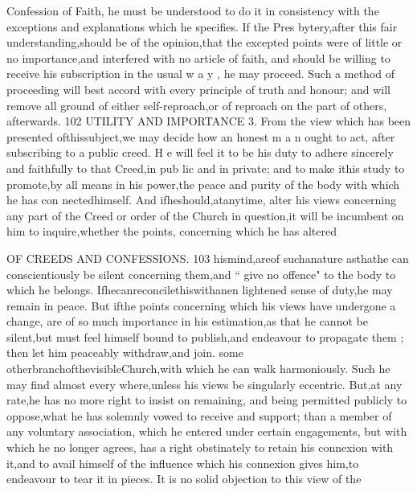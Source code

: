 \documentclass[
]{book}
\begin{document}
Confession of Faith, he must be understood to do it in consistency with the exceptions and explanations which he specifies. If the Pres bytery,after this fair understanding,should be of the opinion,that the excepted points were of little or no importance,and interfered with no article of faith, and should be willing to receive his subscription in the usual w a y , he
may proceed. Such a method of proceeding will best accord with every principle of truth and honour; and will remove all ground of either self-reproach,or of reproach on the part
of others, afterwards.
102 UTILITY AND IMPORTANCE
3. From the view which has been presented
ofthissubject,we may decide how an honest m a n ought to act, after subscribing to a public creed. H e will feel it to be his duty to adhere
sincerely and faithfully to that Creed,in pub
lic and in private; and to make ithis study to
promote,by all means in his power,the peace
and purity of the body with which he has con nectedhimself. And ifheshould,atanytime,
alter his views concerning any part of the Creed or order of the Church in question,it
will be incumbent on him to inquire,whether the points, concerning which he has altered

OF CREEDS AND CONFESSIONS. 103
hismind,areof suchanature asthathe can conscientiously be silent concerning them,and
`` give no offence" to the body to which he belongs. Ifhecanreconcilethiswithanen
lightened sense of duty,he may remain in peace. But ifthe points concerning which his views have undergone a change, are of so much importance in his estimation,as that he cannot be silent,but must feel himself bound to publish,and endeavour to propagate them ; then let him peaceably withdraw,and join. some otherbranchofthevisibleChurch,with which he can walk harmoniously. Such he may find almost every where,unless his views
be singularly eccentric. But,at any rate,he has no more right to insist on remaining, and being permitted publicly to oppose,what he has solemnly vowed to receive and support; than a member of any voluntary association, which he entered under certain engagements, but with which he no longer agrees, has a
right obstinately to retain his connexion with
it,and to avail himself of the influence which
his connexion gives him,to endeavour to tear it in pieces.
It is no solid objection to this view of the
\end{document}

